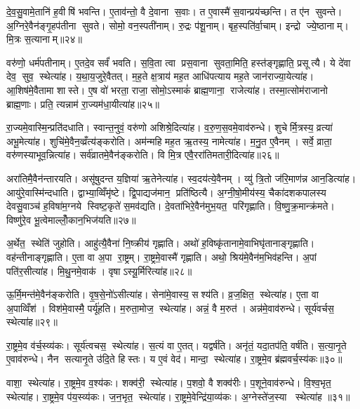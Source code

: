 दे॒व॒सु॒वामे॒तानि॑ ह॒वीषि॑ भवन्ति। ए॒ताव॑न्तो॒ वै दे॒वाना स॒वाः। त ए॒वास्मै॑ स॒वान्प्रय॑च्छन्ति। त ए॑न सुवन्ते। अ॒ग्निरे॒वैन॑ङ्गृ॒हप॑तीना सुवते। सोमो॒ वन॒स्पती॑नाम्। रु॒द्रः प॑शू॒नाम्। बृह॒स्पति॑र्वा॒चाम्। इन्द्रो ज्ये॒ष्ठानाम्। मि॒त्रः स॒त्यानाम्॥२४॥

वरु॑णो॒ धर्म॑पतीनाम्। ए॒तदे॒व सर्वं॑ भवति। स॒वि॒ता त्वा प्रस॒वाना सुवता॒मिति॒ हस्त॑ङ्गृह्णाति॒ प्रसूत्यै। ये दे॑वा देव॒ सुव॒ स्थेत्या॑ह। य॒था॒य॒जुरे॒वैतत्। म॒ह॒ते क्ष॒त्राय॑ मह॒त आधि॑पत्याय मह॒ते जान॑राज्या॒येत्या॑ह। आ॒शिष॑मे॒वैतामा शास्ते। ए॒ष वो॑ भरता॒ राजा॒ सोमो॒ऽस्माकं॑ ब्राह्म॒णाना॒ राजेत्या॑ह। तस्मा॒त्सोम॑राजानो ब्राह्म॒णाः। प्रति॒ त्यन्नाम॑ रा॒ज्यम॑धा॒यीत्या॑ह॥२५॥

रा॒ज्यमे॒वास्मि॒न्प्रति॑दधाति। स्वान्त॒नुवं॒ वरु॑णो अशिश्रे॒दित्या॑ह। व॒रु॒ण॒स॒वमे॒वाव॑रुन्धे। शुचेर्मि॒त्रस्य॒ व्रत्या॑ अभू॒मेत्या॑ह। शुचि॑मे॒वैन॒व्व्रँत्य॑ङ्करोति। अम॑न्महि मह॒त ऋ॒तस्य॒ नामेत्या॑ह। म॒नु॒त ए॒वैनम्। सर्वे॒ व्राता॒ वरु॑णस्याभूव॒न्नित्या॑ह। सर्व॑व्रातमे॒वैन॑ङ्करोति। वि मि॒त्र एवै॒ररा॑तिमतारी॒दित्या॑ह॥२६॥

अरा॑तिमै॒वैन॑न्तारयति। असू॑षुदन्त य॒ज्ञिया॑ ऋ॒तेनेत्या॑ह। स्व॒दय॑त्ये॒वैनम्। व्यु॑ त्रि॒तो ज॑रि॒माण॑न्न आन॒डित्या॑ह। आयु॑रे॒वास्मि॑न्दधाति। द्वाभ्या॒व्विँमृ॑ष्टे। द्वि॒पाद्यज॑मान॒ प्रति॑ष्ठित्यै। अ॒ग्नी॒षो॒मीय॑स्य॒ चैका॑दशकपालस्य देवसु॒वाञ्च॑ ह॒विषा॑म॒ग्नये स्विष्ट॒कृते॑ स॒मव॑द्यति। दे॒वता॑भिरे॒वैन॑मुभ॒यत॒ परि॑गृह्णाति। वि॒ष्णु॒क्र॒मान्क्र॑मते। विष्णु॑रे॒व भू॒त्वेमाल्लोँ॒कान॒भिज॑यति॥२७॥\anuvakamend[स॒त्याना॑मधा॒यीत्या॑हातारी॒दित्या॑ह क्रमत॒ एकं च]

अ॒र्थेत॒ स्थेति॑ जुहोति। आहु॑त्यै॒वैना॑ नि॒ष्क्रीय॑ गृह्णाति। अथो॑ ह॒विष्कृ॑तानामे॒वाभिघृ॑तानाङ्गृह्णाति। वह॑न्तीनाङ्गृह्णाति। ए॒ता वा अ॒पा रा॒ष्ट्रम्। रा॒ष्ट्रमे॒वास्मै॑ गृह्णाति। अथो॒ श्रिय॑मे॒वैन॑म॒भिव॑हन्ति। अ॒पां पति॑र॒सीत्या॑ह। मि॒थु॒नमे॒वाक॑। वृषाऽस्यू॒र्मिरित्या॑ह॥२८॥

ऊ॒र्मि॒मन्त॑मे॒वैन॑ङ्करोति। वृ॒ष॒से॒नो॑ऽसीत्या॑ह। सेना॑मे॒वास्य॒ सश्य॑ति। व्र॒ज॒क्षित॒ स्थेत्या॑ह। ए॒ता वा अ॒पाव्विँश॑। विश॑मे॒वास्मै॒ पर्यू॑हति। म॒रुता॒मोज॒ स्थेत्या॑ह। अन्नं॒ वै म॒रुत॑। अन्न॑मे॒वाव॑रुन्धे। सूर्य॑वर्चस॒ स्थेत्या॑ह॥२९॥

रा॒ष्ट्रमे॒व व॑र्च॒स्व्य॑कः। सूर्य॑त्वचस॒ स्थेत्या॑ह। स॒त्यं वा ए॒तत्। यद्वर्\mbox{}ष॑ति। अनृ॑तं॒ यदा॒तप॑ति॒ वर्\mbox{}ष॑ति। स॒त्या॒नृ॒ते ए॒वाव॑रुन्धे। नैन सत्यानृ॒ते उ॑दि॒ते हिस्तः। य ए॒वं वेद॑। मान्दा॒ स्थेत्या॑ह। रा॒ष्ट्रमे॒व ब्र॑ह्मवर्च॒स्य॑कः॥३०॥

वाशा॒ स्थेत्या॑ह। रा॒ष्ट्रमे॒व व॒श्य॑कः। शक्व॑री॒ स्थेत्या॑ह। प॒शवो॒ वै शक्व॑रीः। प॒शूने॒वाव॑रुन्धे। वि॒श्व॒भृत॒ स्थेत्या॑ह। रा॒ष्ट्रमे॒व प॑य॒स्व्य॑कः। ज॒न॒भृत॒ स्थेत्या॑ह। रा॒ष्ट्रमे॒वेन्द्रि॑या॒व्य॑कः। अ॒ग्नेस्ते॑ज॒स्या स्थेत्या॑ह ॥३१॥

